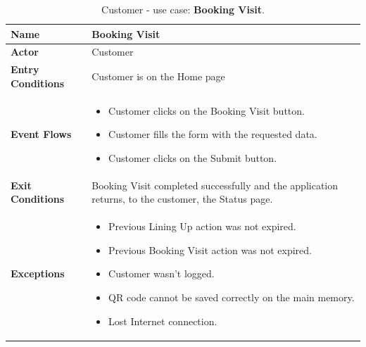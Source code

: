 \begin{table}[hbt!]
\centering
\begin{tabular}{| m{} | m{} |} 
	\hline
	\textbf{Name} & Booking Visit \\ 
	\hline
	\textbf{Actor} & Customer \\ 
	\hline
	\textbf{Entry Conditions} & Customer is on the Home page \\ 
	\hline
	\textbf{Event Flows} &
	\begin{itemize}
	\item Customer clicks on the Booking Visit button.
	\item Customer fills the form with the requested data.
	\item Customer clicks on the Submit button.
	\end{itemize} \\ 
	\hline
	\textbf{Exit Conditions} & Booking Visit completed successfully and the application returns, to the customer, the Status page. \\ 
	\hline
	\textbf{Exceptions} &
	\begin{itemize}
	\item Previous Lining Up action was not expired.
	\item Previous Booking Visit action was not expired.
	\item Customer wasn't logged.
	\item QR code cannot be saved correctly on the main memory.
	\item Lost Internet connection.
	\end{itemize} \\ 
	\hline
\end{tabular}
\caption{Customer - use case: \textbf{Booking Visit}.}
\label{tableLogIn}
\end{table}

